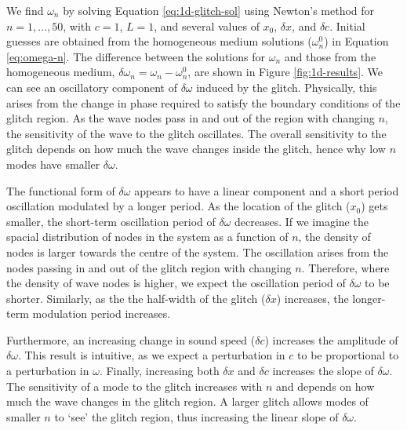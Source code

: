 We find \(\omega_n\) by solving Equation \ref{eq:1d-glitch-sol} using Newton's method for \(n = 1,\dots,50\), with \(c=1\), \(L=1\), and several values of \(x_0\), \(\delta x\), and \(\delta c\). Initial guesses are obtained from the homogeneous medium solutions (\(\omega_n^0\)) in Equation \ref{eq:omega-n}. The difference between the solutions for \(\omega_n\) and those from the homogeneous medium, \(\delta \omega_n = \omega_n - \omega_n^0\), are shown in Figure \ref{fig:1d-results}. We can see an oscillatory component of \(\delta\omega\) induced by the glitch. Physically, this arises from the change in phase required to satisfy the boundary conditions of the glitch region. As the wave nodes pass in and out of the region with changing \(n\), the sensitivity of the wave to the glitch oscillates. The overall sensitivity to the glitch depends on how much the wave changes inside the glitch, hence why low \(n\) modes have smaller \(\delta\omega\).

The functional form of \(\delta\omega\) appears to have a linear component and a short period oscillation modulated by a longer period. As the location of the glitch (\(x_0\)) gets smaller, the short-term oscillation period of \(\delta\omega\) decreases. If we imagine the spacial distribution of nodes in the system as a function of \(n\), the density of nodes is larger towards the centre of the system. The oscillation arises from the nodes passing in and out of the glitch region with changing \(n\). Therefore, where the density of wave nodes is higher, we expect the oscillation period of \(\delta\omega\) to be shorter. Similarly, as the the half-width of the glitch (\(\delta x\)) increases, the longer-term modulation period increases. 

Furthermore, an increasing change in sound speed (\(\delta c\)) increases the amplitude of \(\delta\omega\). This result is intuitive, as we expect a perturbation in \(c\) to be proportional to a perturbation in \(\omega\). Finally, increasing both \(\delta x\) and \(\delta c\) increases the slope of \(\delta\omega\). The sensitivity of a mode to the glitch increases with \(n\) and depends on how much the wave changes in the glitch region. A larger glitch allows modes of smaller \(n\) to `see' the glitch region, thus increasing the linear slope of \(\delta\omega\).


